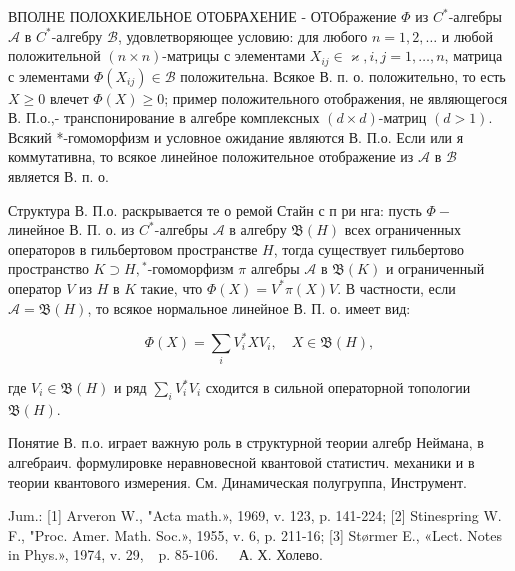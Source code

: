 \documentclass[10pt]{article}
\begin{document}
ВПОЛНЕ ПОЛОХКИЕЛЬНОЕ ОТОБРАХЕНИЕ - ОТОбражение $\Phi$ из $C^{*}$-алгебры $\mathscr{A}$ в $C^{*}$-алгебру $\mathscr{B}$, удовлетворяющее условию: для любого $n=1,2, \ldots$ и любой положительной $(n \times n)$-матрицы с элементами $X_{i j} \in \mathscr{\varkappa}, i, j=1, \ldots, n$, матрица с элементами $\Phi\left(X_{i j}\right) \in \mathscr{B}$ положительна. Всякое В. п. о. положительно, то есть $X \geqslant 0$ влечет $\Phi(X) \geqslant 0$; пример положительного отображения, не являющегося В. П.о.,- транспонирование в алгебре комплексных $(d \times d)$-матриц $(d>1)$. Всякий *-гомоморфизм и условное ожидание являются В. П.о. Если или я коммутативна, то всякое линейное положительное отображение из $\mathscr{A}$ в $\mathscr{B}$ является В. п. о.



Структура В. П.о. раскрывается те о ремой Стайн с п ри нга: пусть $\Phi-$ линейное В. П. о. из $C^{*}$-алгебры $\mathscr{A}$ в алгебру $\mathfrak{B}(H)$ всех ограниченных операторов в гильбертовом пространстве $H$, тогда существует гильбертово пространство $K \supset H,{ }^{*}$-гомоморфизм $\pi$ алгебры $\mathscr{A}$ в $\mathfrak{B}(K)$ и ограниченный оператор $V$ из $H$ в $K$ такие, что $\Phi(X)=V^{*} \pi(X) V$. В частности, если $\mathscr{A}=\mathfrak{B}(H)$, то всякое нормальное линейное В. П. о. имеет вид:



\[

\Phi(X)=\sum_{i} V_{i}^{*} X V_{i}, \quad X \in \mathfrak{B}(H),

\]



где $V_{i} \in \mathfrak{B}(H)$ и ряд $\sum_{i} V_{i}^{*} V_{i}$ сходится в сильной операторной топологии $\mathfrak{B}(H)$.



Понятие В. п.о. играет важную роль в структурной теории алгебр Неймана, в алгебраич. формулировке неравновесной квантовой статистич. механики и в теории квантового измерения. См. Динамическая полугруппа, Инструмент.



Jum.: [1] Arveron W., "Acta math.», 1969, v. 123, p. 141-224; [2] Stinespring W. F., "Proc. Amer. Math. Soc.», 1955, v. 6, p. 211-16; [3] Størmer E., «Lect. Notes in Phys.», 1974, v. 29, $\begin{array}{ll}\text { p. 85-106. } & \text { А. Х. Холево. }\end{array}$
\end{document}
